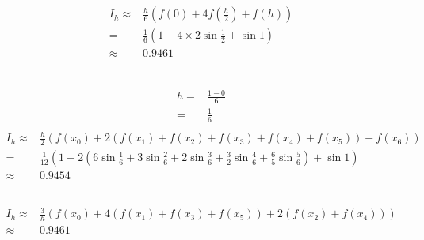 \documentclass{article}
\begin{document}
        \subsection{}
            \paragraph{}
            \begin{equation*}
                \begin{split}
                    I_h\approx&\frac{h}{6}(f(0)+4f(\frac{h}{2})+f(h))\\
                        =&\frac{1}{6}(1+4\times2\sin \frac{1}{2}+\sin 1)\\
                        \approx&0.9461\\
                \end{split}
            \end{equation*}
        \subsection{}
            \paragraph{}
            \begin{equation*}
                \begin{split}
                    h=&\frac{1-0}{6}\\
                        =&\frac{1}{6}\\
                \end{split}
            \end{equation*}
            \begin{equation*}
                \begin{split}
                    I_h\approx&\frac{h}{2}(f(x_0)+2(f(x_1)+f(x_2)+f(x_3)+f(x_4)+f(x_5))+f(x_6))\\
                        =&\frac{1}{12}(1+2(6\sin \frac{1}{6}+3\sin\frac{2}{6}+2\sin \frac{3}{6}+\frac{3}{2}\sin \frac{4}{6}+\frac{6}{5}\sin \frac{5}{6})+\sin 1)\\
                        \approx&0.9454
                \end{split}
            \end{equation*}
        \subsection{}
            \paragraph{}
            \begin{equation*}
                \begin{split}
                    I_h\approx&\frac{3}{h}(f(x_0)+4(f(x_1)+f(x_3)+f(x_5))+2(f(x_2)+f(x_4)))\\
                        \approx&0.9461
                \end{split}
            \end{equation*}
\end{document}
